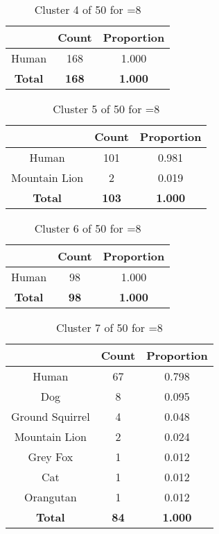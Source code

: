 \begin{table}[ht!]
\centering
\begin{tabular}{|c|c|c|}
\hline
\bf \Spec{} &\bf Count &\bf Proportion\\ \hline \hline
Human & 168 & 1.000\\ \hline
\hline
\bf Total & \bf 168 & \bf 1.000\\ \hline
\end{tabular}
\label{tab:cluster:4:8}
\caption{Cluster 4 of 50 for \minneigh{}=8}
\end{table}

\begin{table}[ht!]
\centering
\begin{tabular}{|c|c|c|}
\hline
\bf \Spec{} &\bf Count &\bf Proportion\\ \hline \hline
Human & 101 & 0.981\\ \hline
Mountain Lion & 2 & 0.019\\ \hline
\hline
\bf Total & \bf 103 & \bf 1.000\\ \hline
\end{tabular}
\label{tab:cluster:5:8}
\caption{Cluster 5 of 50 for \minneigh{}=8}
\end{table}

\begin{table}[ht!]
\centering
\begin{tabular}{|c|c|c|}
\hline
\bf \Spec{} &\bf Count &\bf Proportion\\ \hline \hline
Human & 98 & 1.000\\ \hline
\hline
\bf Total & \bf 98 & \bf 1.000\\ \hline
\end{tabular}
\label{tab:cluster:6:8}
\caption{Cluster 6 of 50 for \minneigh{}=8}
\end{table}

\begin{table}[ht!]
\centering
\begin{tabular}{|c|c|c|}
\hline
\bf \Spec{} &\bf Count &\bf Proportion\\ \hline \hline
Human & 67 & 0.798\\ \hline
Dog & 8 & 0.095\\ \hline
Ground Squirrel & 4 & 0.048\\ \hline
Mountain Lion & 2 & 0.024\\ \hline
Grey Fox & 1 & 0.012\\ \hline
Cat & 1 & 0.012\\ \hline
Orangutan & 1 & 0.012\\ \hline
\hline
\bf Total & \bf 84 & \bf 1.000\\ \hline
\end{tabular}
\label{tab:cluster:7:8}
\caption{Cluster 7 of 50 for \minneigh{}=8}
\end{table}


